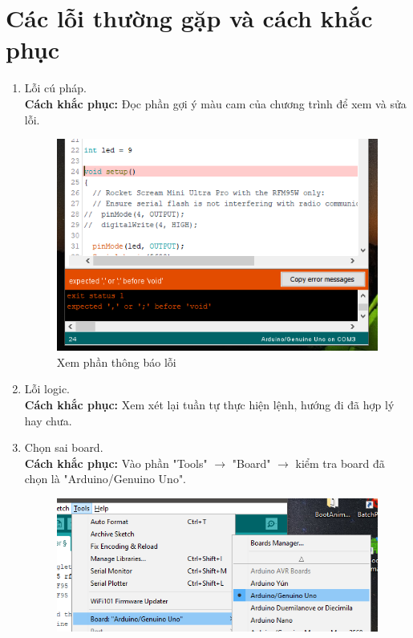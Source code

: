 \section{Các lỗi thường gặp và cách khắc phục}
\begin{enumerate}
\item Lỗi cú pháp.\\
\textbf{Cách khắc phục:} Đọc phần gợi ý màu cam của chương trình để xem và sửa lỗi.
\begin{center}
\begin{figure}[htp]
\begin{center}
\includegraphics[scale=0.9]{image4/loi1.png}
\end{center}
\caption{Xem phần thông báo lỗi}
\end{figure}
\end{center}
\newpage
\item Lỗi logic.\\
\textbf{Cách khắc phục:} Xem xét lại tuần tự thực hiện lệnh, hướng đi đã hợp lý hay chưa.
\item Chọn sai board.\\
\textbf{Cách khắc phục:} Vào phần "Tools" $\rightarrow$ "Board" $\rightarrow$ kiểm tra board đã chọn là "Arduino/Genuino Uno".
\begin{center}
\begin{figure}[htp]
\begin{center}
\includegraphics[scale=0.9]{image4/loi3.png}

\end{center}
\end{figure}
\end{center}
\end{enumerate}
